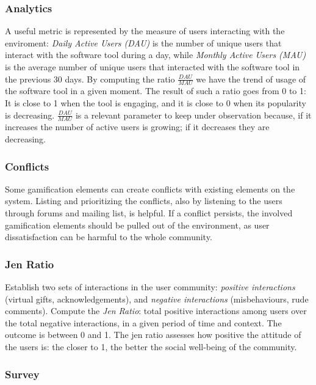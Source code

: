 \subsubsection{Analytics}

A useful metric is represented by the measure of users interacting with the enviroment: \emph{Daily Active Users (DAU)} is the number of unique users that interact with the software tool during a day, while \emph{Monthly Active Users (MAU)} is the average number of unique users that interacted with the software tool in the previous 30 days.
By computing the ratio $\frac{\textit{DAU}}{\textit{MAU}}$ we have the trend of usage of the software tool in a given moment.
The result of such a ratio goes from 0 to 1: It is close to 1 when the tool is engaging, and it is close to 0 when its popularity is decreasing.
$\frac{\textit{DAU}}{\textit{MAU}}$ is a relevant parameter to keep under observation because, if it increases the number of active users is growing; if it decreases they are decreasing.


\subsubsection{Conflicts}

Some gamification elements can create conflicts with existing elements on the system.
Listing and prioritizing the conflicts, also by listening to the users through forums and mailing list, is helpful.
If a conflict persists, the involved gamification elements should be pulled out of the environment, as user dissatisfaction can be harmful to the whole community.


\subsubsection{Jen Ratio}

Establish two sets of interactions in the user community: \emph{positive interactions} (\eg virtual gifts, acknowledgements), and \emph{negative interactions} (\eg misbehaviours, rude comments).
Compute the \emph{Jen Ratio}: total positive interactions among users over the total negative interactions, in a given period of time and context.
The outcome is between 0 and 1.
The jen ratio assesses how positive the attitude of the users is: the closer to 1, the better the social well-being of the community.


\subsubsection{Survey}

